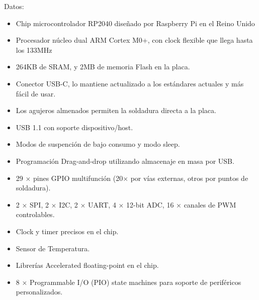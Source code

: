            Datos:\par
                \begin{itemize}[label=•]
                    \setlength{\itemindent}{2em}
                    
                    \item Chip microcontrolador RP2040 diseñado por Raspberry Pi en el Reino Unido\par
                    \item Procesador núcleo dual ARM Cortex M0+, con clock flexible que llega hasta los 133MHz\par
                    \item 264KB de SRAM, y 2MB de memoria Flash en la placa.
                    \item Conector USB-C, lo mantiene actualizado a los estándares actuales y más fácil de usar.\par
                    \item Los agujeros almenados permiten la soldadura directa a la placa.\par
                    \item USB 1.1 con soporte dispositivo/host.\par
                    \item Modos de suspención de bajo consumo y modo sleep.\par
                    \item Programación Drag-and-drop utilizando almacenaje en masa por USB.\par
                    \item 29 × pines GPIO multifunción (20× por vías externas, otros por puntos de soldadura).\par
                    \item 2 × SPI, 2 × I2C, 2 × UART, 4 × 12-bit ADC, 16 × canales de PWM controlables.\par
                    \item Clock y timer precisos en el chip.\par
                    \item Sensor de Temperatura.\par
                    \item Librerías     Accelerated floating-point en el chip.\par
                    \item 8 × Programmable I/O (PIO) state machines para soporte de periféricos personalizados.\par
                \end{itemize}
            
